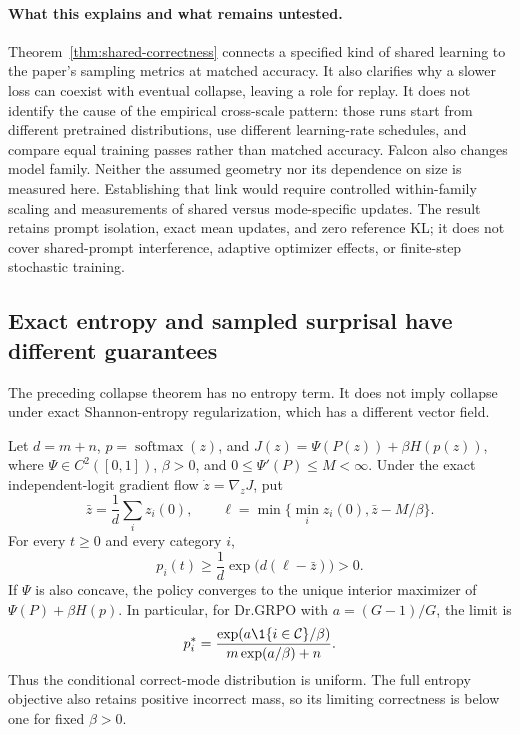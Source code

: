 \paragraph{What this explains and what remains untested.}
Theorem~\ref{thm:shared-correctness} connects a specified kind of shared
learning to the paper's sampling metrics at matched accuracy. It also
clarifies why a slower loss can coexist with eventual collapse, leaving a
role for replay. It does not identify the cause of the empirical cross-scale
pattern: those runs start from different pretrained distributions, use
different learning-rate schedules, and compare equal training passes rather
than matched accuracy. Falcon also changes model family. Neither the assumed
geometry nor its dependence on size is measured here. Establishing that link
would require controlled within-family scaling and measurements of shared
versus mode-specific updates. The result retains prompt isolation, exact
mean updates, and zero reference KL; it does not cover shared-prompt
interference, adaptive optimizer effects, or finite-step stochastic training.

\subsection{Exact entropy and sampled surprisal have different guarantees}
\label{app:theory-entropy}
The preceding collapse theorem has no entropy term. It does not imply collapse
under exact Shannon-entropy regularization, which has a different vector field.

\begin{lemma}
\label{lem:entropy-scope}
Let $d=m+n$, $p=\operatorname{softmax}(z)$, and
$J(z)=\Psi(P(z))+\beta H(p(z))$, where $\Psi\in C^2([0,1])$, $\beta>0$, and
$0\le\Psi'(P)\le M<\infty$. Under the exact independent-logit gradient flow
$\dot z=\nabla_zJ$, put
\[
 \bar z=\frac1d\sum_i z_i(0),\qquad
 \ell=\min\{\min_i z_i(0),\bar z-M/\beta\}.
\]
For every $t\ge0$ and every category $i$,
\[
 p_i(t)\ge \frac1d\exp\!\bigl(d(\ell-\bar z)\bigr)>0.
\]
If $\Psi$ is also concave, the policy
converges to the unique interior maximizer of $\Psi(P)+\beta H(p)$.
In particular, for Dr.GRPO with $a=(G-1)/G$, the limit is
\[
 p_i^*=\frac{\exp(a\1\{i\in\mathcal C\}/\beta)}
 {m\exp(a/\beta)+n}.
\]
Thus the conditional correct-mode distribution is uniform. The full entropy
objective also retains positive incorrect mass, so its limiting correctness
is below one for fixed $\beta>0$.
\end{lemma}

